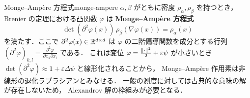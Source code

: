 \begin{remark}{Monge--Amp\`{e}re 方程式}{monge-ampere}
  $\alpha, \beta$ がともに密度 $\rho_\alpha, \rho_\beta$ を持つとき，
  Brenier の定理における凸関数 $\varphi$ は
  \textbf{Monge--Amp\`{e}re 方程式}
  \[
    \det(\partial^2 \varphi(x)) \, \rho_\beta(\nabla\varphi(x)) = \rho_\alpha(x)
  \]
  を満たす．ここで $\partial^2 \varphi(x) \in \mathbb{R}^{d \times d}$ は
  $\varphi$ の二階偏導関数を成分とする行列
  $(\partial^2 \varphi)_{k,l} = \frac{\partial^2 \varphi}{\partial x_k \partial x_l}$
  である．
  これは変位 $\varphi = \frac{\lVert \cdot \rVert^2}{2} + \varepsilon\psi$ が小さいとき
  $\det(\partial^2\varphi) \approx 1 + \varepsilon\Delta\psi$ と線形化されることから，
  Monge--Amp\`{e}re 作用素は非線形の退化ラプラシアンとみなせる．
  一般の測度に対しては古典的な意味の解が存在しないため，
  Alexandrov 解の枠組みが必要となる．
\end{remark}

